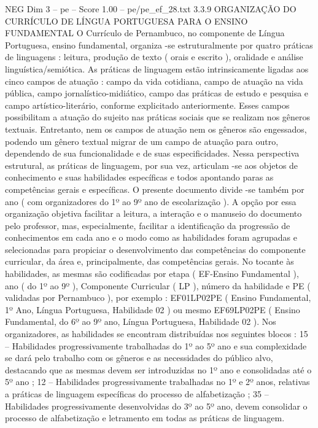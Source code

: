 \begin{textsample}{NEG Dim 3 – pe – Score 1.00 – pe/pe\_ef\_28.txt}  \label{ex:f3_neg_008}
3.3.9 ORGANIZAÇÃO DO CURRÍCULO DE LÍNGUA PORTUGUESA PARA O ENSINO FUNDAMENTAL O Currículo de Pernambuco, no componente de Língua Portuguesa, ensino fundamental, organiza -se estruturalmente por quatro práticas de linguagens : leitura, produção de texto ( orais e escrito ), oralidade e análise linguística/semiótica.
As práticas de linguagem estão intrinsicamente ligadas aos cinco campos de atuação : campo da vida cotidiana, campo de atuação na vida pública, campo jornalístico-midiático, campo das práticas de estudo e pesquisa e campo artístico-literário, conforme explicitado anteriormente.
Esses campos possibilitam a atuação do sujeito nas práticas sociais que se realizam nos gêneros textuais.
Entretanto, nem os campos de atuação nem os gêneros são engessados, podendo um gênero textual migrar de um campo de atuação para outro, dependendo de sua funcionalidade e de suas especificidades.
Nessa perspectiva estrutural, as práticas de linguagem, por sua vez, articulam -se aos objetos de conhecimento e suas habilidades específicas e todos apontando paras as competências gerais e específicas.
O presente documento divide -se também por ano ( com organizadores do 1º ao 9º ano de escolarização ).
A opção por essa organização objetiva facilitar a leitura, a interação e o manuseio do documento pelo professor, mas, especialmente, facilitar a identificação da progressão de conhecimentos em cada ano e o modo como as habilidades foram agrupadas e selecionadas para propiciar o desenvolvimento das competências do componente curricular, da área e, principalmente, das competências gerais.
No tocante às habilidades, as mesmas são codificadas por etapa ( EF-Ensino Fundamental ), ano ( do 1º ao 9º ), Componente Curricular ( LP ), número da habilidade e PE ( validadas por Pernambuco ), por exemplo : EF01LP02PE ( Ensino Fundamental, 1º Ano, Língua Portuguesa, Habilidade 02 ) ou mesmo EF69LP02PE ( Ensino Fundamental, do 6º ao 9º ano, Língua Portuguesa, Habilidade 02 ).
Nos organizadores, as habilidades se encontram distribuídas nos seguintes blocos : 15 – Habilidades progressivamente trabalhadas do 1º ao 5º ano e sua complexidade se dará pelo trabalho com os gêneros e as necessidades do público alvo, destacando que as mesmas devem ser introduzidas no 1º ano e consolidadas até o 5º ano ; 12 – Habilidades progressivamente trabalhadas no 1º e 2º anos, relativas a práticas de linguagem específicas do processo de alfabetização ; 35 – Habilidades progressivamente desenvolvidas do 3º ao 5º ano, devem consolidar o processo de alfabetização e letramento em todas as práticas de linguagem.

\end{textsample}
